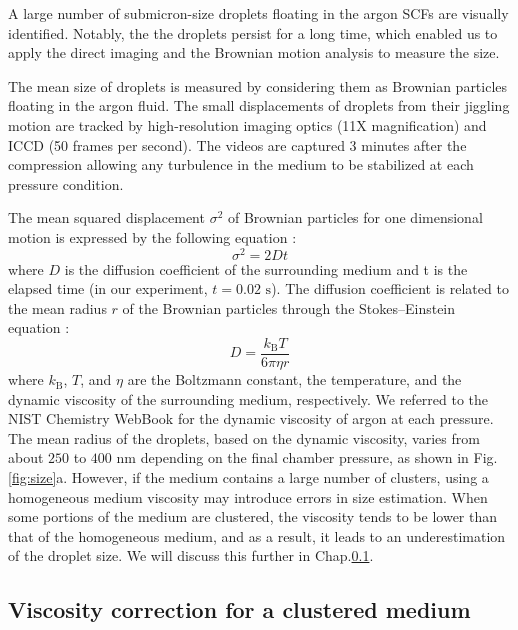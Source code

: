 A large number of submicron-size droplets floating in the argon SCFs are visually identified. Notably, the the droplets persist for a long time, which enabled us to apply the direct imaging and the Brownian motion analysis to measure the size.

The mean size of droplets is measured by considering them as Brownian particles floating in the argon fluid. The small displacements of droplets from their jiggling motion are tracked by high-resolution imaging optics (11X magnification) and ICCD (50 frames per second). The videos are captured 3 minutes after the compression allowing any turbulence in the medium to be stabilized at each pressure condition. 

The mean squared displacement $\sigma^2$ of Brownian particles for one dimensional motion is expressed by the following equation \cite{einstein1956investigations}:
\begin{equation}
\sigma^2 = 2Dt
\end{equation}
where $D$ is the diffusion coefficient of the surrounding medium and t is the elapsed time (in our experiment, $t=0.02 \text{ s}$). The diffusion coefficient is related to the mean radius $r$ of the Brownian particles through the Stokes–Einstein equation \cite{einstein1956investigations}:
\begin{equation}
D=\frac{k_\text{B} T}{6\pi \eta r}
\label{eq:einstein}
\end{equation}
where $k_\text{B}$, $T$, and $\eta$ are the Boltzmann constant, the temperature, and the dynamic viscosity of the surrounding medium, respectively. We referred to the NIST Chemistry WebBook \cite{linstorm2020nist} for the dynamic viscosity of argon at each pressure. The mean radius of the droplets, based on the dynamic viscosity, varies from about $250$ to $400 \text{ nm}$ depending on the final chamber pressure, as shown in Fig.\ref{fig:size}a. However, if the medium contains a large number of clusters, using a homogeneous medium viscosity may introduce errors in size estimation. When some portions of the medium are clustered, the viscosity tends to be lower than that of the homogeneous medium, and as a result, it leads to an underestimation of the droplet size. We will discuss this further in Chap.\ref{sec:ch2-4-2}.

\subsection{Viscosity correction for a clustered medium}
\label{sec:ch2-4-2}

